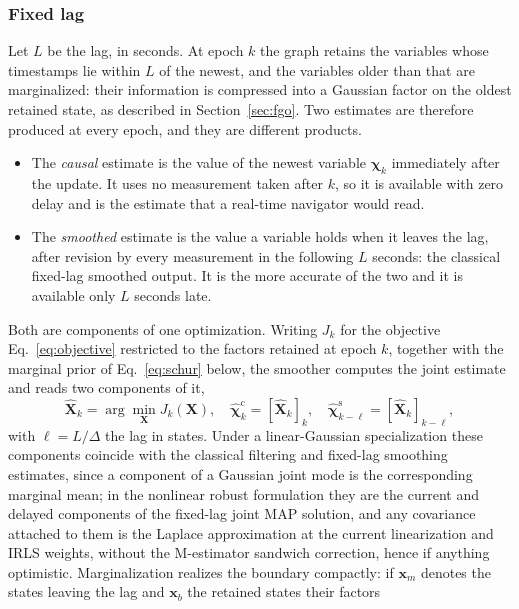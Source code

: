 \documentclass{IEEEtaes}
\begin{document}
\subsubsection{Fixed lag}
Let $L$ be the lag, in seconds. At epoch $k$ the graph retains the variables
whose timestamps lie within $L$ of the newest, and the variables older than that
are marginalized: their information is compressed into a Gaussian factor on the
oldest retained state, as described in Section~\ref{sec:fgo}. Two estimates are
therefore produced at every epoch, and they are different products.
\begin{itemize}
\item The \emph{causal} estimate is the value of the newest variable
$\boldsymbol{\chi}_k$ immediately after the update. It uses no measurement taken
after $k$, so it is available with zero delay and is the estimate that a
real-time navigator would read.
\item The \emph{smoothed} estimate is the value a variable holds when it
leaves the lag, after revision by every measurement in the following $L$
seconds: the classical fixed-lag smoothed output. It is the more accurate of
the two and it is available only $L$ seconds late.
\end{itemize}
Both are components of one optimization. Writing $J_k$ for the objective
Eq.~\eqref{eq:objective} restricted to the factors retained at epoch $k$,
together with the marginal prior of Eq.~\eqref{eq:schur} below, the smoother
computes the joint estimate and reads two components of it,
\begin{equation}
\hat{\mathbf{X}}_k=\arg\min_{\mathbf{X}}J_k(\mathbf{X}),\quad
\hat{\boldsymbol{\chi}}^{\mathrm{c}}_{k}=[\hat{\mathbf{X}}_k]_{k},\quad
\hat{\boldsymbol{\chi}}^{\mathrm{s}}_{k-\ell}=[\hat{\mathbf{X}}_k]_{k-\ell},
\label{eq:twoposteriors}
\end{equation}
with $\ell=L/\Delta$ the lag in states. Under a linear-Gaussian
specialization these components coincide with the classical filtering and
fixed-lag smoothing estimates, since a component of a Gaussian joint mode is
the corresponding marginal mean; in the nonlinear robust formulation they are
the current and delayed components of the fixed-lag joint MAP solution, and
any covariance attached to them is the Laplace approximation at the current
linearization and IRLS weights, without the M-estimator sandwich correction,
hence if anything optimistic.
Marginalization realizes the boundary compactly: if $\mathbf{x}_m$ denotes the
states leaving the lag and $\mathbf{x}_b$ the retained states their factors
\end{document}
